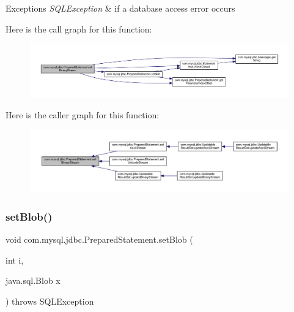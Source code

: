 \begin{DoxyExceptions}{Exceptions}
{\em S\+Q\+L\+Exception} & if a database access error occurs \\
\hline
\end{DoxyExceptions}
Here is the call graph for this function\+:
\nopagebreak
\begin{figure}[H]
\begin{center}
\leavevmode
\includegraphics[width=350pt]{classcom_1_1mysql_1_1jdbc_1_1_prepared_statement_a230dbbbaa17cdab8c8a70125a6b8bbca_cgraph}
\end{center}
\end{figure}
Here is the caller graph for this function\+:
\nopagebreak
\begin{figure}[H]
\begin{center}
\leavevmode
\includegraphics[width=350pt]{classcom_1_1mysql_1_1jdbc_1_1_prepared_statement_a230dbbbaa17cdab8c8a70125a6b8bbca_icgraph}
\end{center}
\end{figure}
\mbox{\label{classcom_1_1mysql_1_1jdbc_1_1_prepared_statement_a923cc59072cb8539196d7288f1830f0d}} 
\subsubsection{\texorpdfstring{set\+Blob()}{setBlob()}}
{\footnotesize\ttfamily void com.\+mysql.\+jdbc.\+Prepared\+Statement.\+set\+Blob (\begin{DoxyParamCaption}\item[{int}]{i,  }\item[{java.\+sql.\+Blob}]{x }\end{DoxyParamCaption}) throws S\+Q\+L\+Exception}

